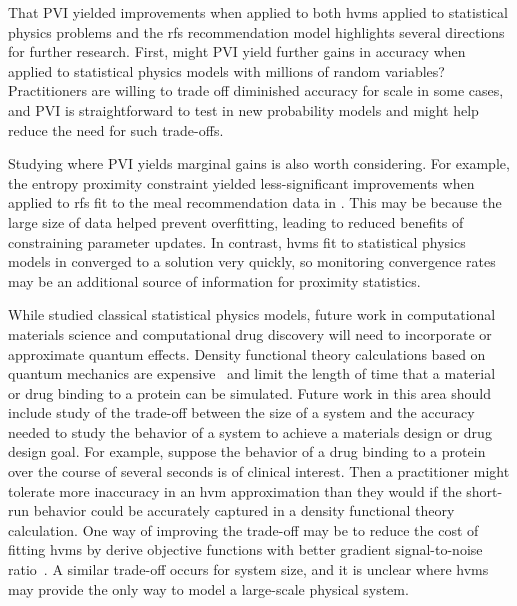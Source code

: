 That \gls{PVI} yielded improvements when applied to both \glspl{hvm} applied to statistical physics problems and the \gls{rfs} recommendation model highlights several directions for further research. First, might \gls{PVI} yield further gains in accuracy when applied to statistical physics models with millions of random variables? Practitioners are willing to trade off diminished accuracy for scale in some cases, and \gls{PVI} is straightforward to test in new probability models and might help reduce the need for such trade-offs.


Studying where \gls{PVI} yields marginal gains is also worth considering. For example, the entropy proximity constraint yielded less-significant improvements when applied to \gls{rfs} fit to the meal recommendation data in . This may be because the large size of data helped prevent overfitting, leading to reduced benefits of constraining parameter updates. In contrast, \glspl{hvm} fit to statistical physics models in  converged to a solution very quickly, so monitoring convergence rates may be an additional source of information for proximity statistics.


While  studied classical statistical physics models, future work in computational materials science and computational drug discovery will need to incorporate or approximate quantum effects. Density functional theory calculations based on quantum mechanics are expensive~\citep{schmidt2019recent} and limit the length of time that a material or drug binding to a protein can be simulated. Future work in this area should include study of the trade-off between the size of a system and the accuracy needed to study the behavior of a system to achieve a materials design or drug design goal. For example, suppose the behavior of a drug binding to a protein over the course of several seconds is of clinical interest. Then a practitioner might tolerate more inaccuracy in an \gls{hvm} approximation than they would if the short-run behavior could be accurately captured in a density functional theory calculation. One way of improving the trade-off may be to reduce the cost of fitting \glspl{hvm} by derive objective functions with better gradient signal-to-noise ratio~\citep{tucker2018doubly,rainforth2018tighter}. A similar trade-off occurs for system size, and it is unclear where \glspl{hvm} may provide the only way to model a large-scale physical system.

